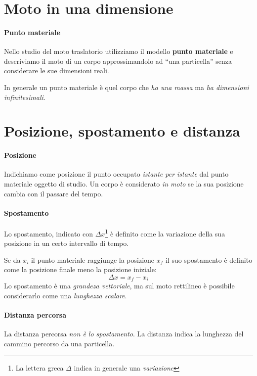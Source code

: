 \documentclass[12pt,oneside]{book}
\begin{document}
\section{Moto in una dimensione}

\paragraph{Punto materiale}
Nello studio del moto traslatorio utilizziamo il modello \textbf{punto materiale} e descriviamo il moto di un corpo approssimandolo ad
“una particella” senza considerare le sue dimensioni reali.

In generale un punto materiale è quel corpo che \emph{ha una massa} ma \emph{ha dimensioni infinitesimali}.

\section{Posizione, spostamento e distanza}

\paragraph{Posizione} Indichiamo come posizione il punto occupato \emph{istante per istante} dal punto materiale oggetto di studio.
Un corpo è considerato \emph{in moto} se la sua posizione cambia con il passare del tempo.

\paragraph{Spostamento} Lo spostamento, indicato con $\Delta x$\footnote{La lettera greca $\Delta$ indica in generale una \emph{variazione}} è definito come la variazione della sua posizione in un certo intervallo di tempo.

Se da $x_i$ il punto materiale raggiunge la posizione $x_f$ il suo spostamento è definito come la posizione finale meno la posizione iniziale:
\begin{equation*}
    \Delta x = x_f - x_i
\end{equation*}
Lo spostamento è una \emph{grandeza vettoriale}, ma sul moto rettilineo è possibile considerarlo come una \emph{lunghezza scalare}.

\paragraph{Distanza percorsa}
La distanza percorsa \emph{non è lo spostamento}. La distanza indica la lunghezza del cammino percorso da una particella.
\end{document}
